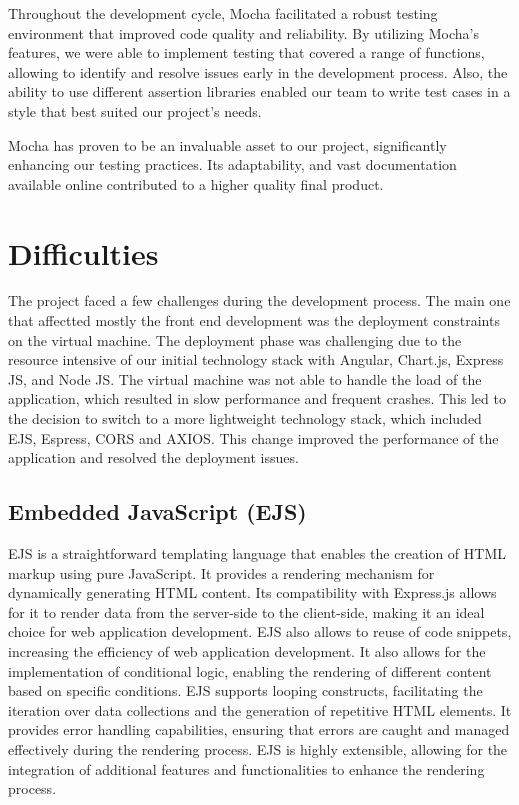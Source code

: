 Throughout the development cycle, Mocha facilitated a robust testing environment that improved code quality and reliability. By utilizing Mocha's features, we were able to 
implement testing that covered a range of functions, allowing to identify and resolve issues early in the development process. 
Also, the ability to use different assertion libraries enabled our team to write test cases in a style that best suited our project's needs.

Mocha has proven to be an invaluable asset to our project, significantly enhancing our testing practices. Its adaptability, and vast documentation available online contributed 
to a higher quality final product.


\section{Difficulties}

The project faced a few challenges during the development process. The main one that affectted mostly the front end development was the deployment constraints on the virtual machine.
The deployment phase was challenging due to the resource intensive of our initial technology stack with Angular, Chart.js, Express JS, and Node JS. The virtual machine was not able
to handle the load of the application, which resulted in slow performance and frequent crashes. This led to the decision to switch to a more lightweight technology stack, 
which included EJS, Espress, CORS and AXIOS. This change improved the performance of the application and resolved the deployment issues.

\subsection{Embedded JavaScript (EJS)}
EJS is a straightforward templating language that enables the creation of HTML markup using pure JavaScript. It provides a rendering mechanism for dynamically generating HTML content.\cite{ejs}
Its compatibility with Express.js allows for it to render data from the server-side to the client-side, making it an ideal choice for web application development. 
EJS also allows to reuse of code snippets, increasing the efficiency of web application development. 
It also allows for the implementation of conditional logic, enabling the rendering of different content based on specific conditions. EJS supports looping constructs, facilitating the iteration over data collections 
and the generation of repetitive HTML elements. It provides error handling capabilities, ensuring that errors are caught and managed effectively during the rendering process. EJS is highly extensible,
allowing for the integration of additional features and functionalities to enhance the rendering process. \cite{ejs}

